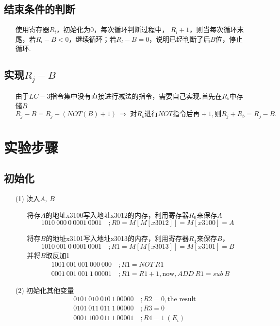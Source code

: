 \documentclass[UTF8]{ctexart}
\begin{document}
\subsection{结束条件的判断}
    \begin{enumerate}
        \item []使用寄存器$R_l$，初始化为0，每次循环判断过程中，
        $R_l+1$，则当每次循环末尾，若$R_l -B<0 $，继续循环；若$R_l - B=0$，说明已经判断了后$B$位，停止循环.
    \end{enumerate}
\subsection{实现$R_j - B$}
    \begin{enumerate}
        \item []由于$LC-3$指令集中没有直接进行减法的指令，需要自己实现.首先在$R_b$中存储$B$
        \[
            R_j - B =R_j + (NOT (B) +1)
            \ \Rightarrow\ 
            \mbox{对}R_b\mbox{进行$NOT$指令后再}+1,\mbox{则}R_j + R_b = R_j -B .
        \]
    \end{enumerate}

\clearpage
\section{实验步骤}
\subsection{初始化}
\begin{enumerate}
    \item [(1)]读入$A,\ B$
    \begin{enumerate}
        \item []将存$A$的地址x3100写入地址x3012的内存，利用寄存器$R_0$来保存$A$
        \[
            1010\ 000\ 0\  0001\ 0001\quad    ;R0=M[M[x3012]]=M[x3100]=A
        \]
        \item []将存$B$的地址x3101写入地址x3013的内存，利用寄存器$R_1$来保存$B$，
        \[
            1010\ 001\ 0\ 0001\ 0001\quad    ;R1=M[M[x3013]]=M[x3101]=B
        \]
        并将$B$取反加1
        \begin{align*}
            &1001\ 001\ 001\ 000\ 000\quad    ;R1=NOT\ R1\\
            &0001\ 001\ 001\ 1\ 00001\quad    ;R1=R1+1,\mbox{now},ADD\ R1 =sub\ B
        \end{align*}
    \end{enumerate}
    \item [(2)]初始化其他变量
    \begin{align*}
        &0101\ 010\ 010\ 1\ 00000\quad    ;R2=0,\mbox{the result}\\
        &0101\ 011\ 011\ 1\ 00000\quad    ;R3=0\\
        &0001\ 100\ 011\ 1\ 00001\quad    ;R4=1\ (E_i)
    \end{align*}
\end{enumerate}
\end{document}
